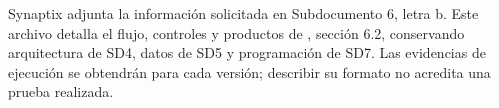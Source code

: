 \documentclass[11pt,letterpaper]{report}
\begin{document}
\tableofcontents\clearpage
{}
Synaptix adjunta la información solicitada en Subdocumento 6, letra b. Este archivo detalla el flujo, controles y productos de \ArchivoSDSeis, sección 6.2, conservando arquitectura de SD4, datos de SD5 y programación de SD7. Las evidencias de ejecución se obtendrán para cada versión; describir su formato no acredita una prueba realizada.\parencite[Formulario T-10, p.~61]{sd6-ba}

\CierreSubdocumento
\end{document}
